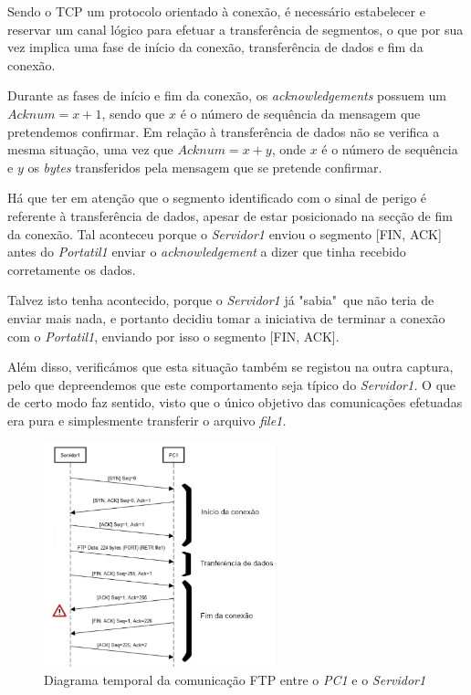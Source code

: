         Sendo o TCP um protocolo orientado à conexão, é necessário estabelecer e reservar um canal lógico para efetuar a transferência de segmentos, o que por sua vez implica uma fase de início da conexão, transferência de dados e fim da conexão.

        Durante as fases de início e fim da conexão, os \textit{acknowledgements} possuem um $Acknum = x+1$, sendo que $x$ é o número de sequência da mensagem que pretendemos confirmar. Em relação à transferência de dados não se verifica a mesma situação, uma vez que $Acknum = x + y$, onde $x$ é o número de sequência e $y$ os \textit{bytes} transferidos pela mensagem que se pretende confirmar.

        Há que ter em atenção que o segmento identificado com o sinal de perigo é referente à transferência de dados, apesar de estar posicionado na secção de fim da conexão. Tal aconteceu porque o \textit{Servidor1} enviou o segmento [FIN, ACK] antes do \textit{Portatil1} enviar o \textit{acknowledgement} a dizer que tinha recebido corretamente os dados.
        
        Talvez isto tenha acontecido, porque o \textit{Servidor1} já "sabia"~que não teria de enviar mais nada, e portanto decidiu tomar a iniciativa de terminar a conexão com o \textit{Portatil1}, enviando por isso o segmento [FIN, ACK].

        Além disso, verificámos que esta situação também se registou na outra captura, pelo que depreendemos que este comportamento seja típico do \textit{Servidor1.} O que de certo modo faz sentido, visto que o único objetivo das comunicações efetuadas era pura e simplesmente transferir o arquivo \textit{file1.}

        \begin{figure}[hb!]
            \centering
            \includegraphics[width=0.6\textwidth]{Imagens/6.png}
            \caption{Diagrama temporal da comunicação FTP entre o \textit{PC1} e o \textit{Servidor1}}
            \vspace{-10pt}
        \end{figure}

